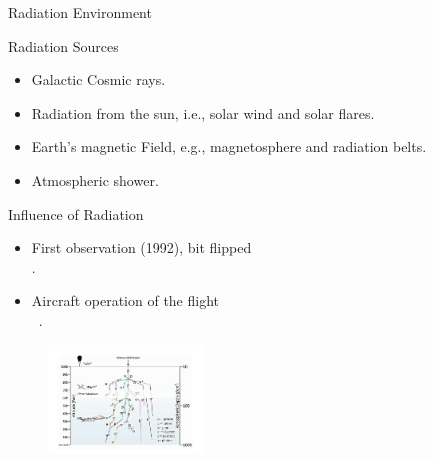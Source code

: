 \documentclass[aspectratio=1610]{beamer}
\begin{document}
\begin{frame}{Radiation Environment}



\begin{block}{Radiation Sources}

\end{block}
\begin{itemize}

\item Galactic Cosmic rays.
\item Radiation from the sun, i.e., solar wind and solar flares.
\item Earth's magnetic Field, e.g., magnetosphere and radiation belts.
\item Atmospheric shower.
\end{itemize}


\begin{block}{Influence of Radiation}
\end{block}
\begin{itemize}

\item First observation (1992), bit flipped~ \\\citep{taber1995investigation}.
\item Aircraft operation of the flight \\ ~\citep{SWE2016}.


\end{itemize}
\vspace{-3cm}

\begin{figure}[h]
   \includegraphics[width=0.37\textwidth, right]{Figures/showerplusaircraft.png}

\label{shower}
\end{figure}
\vspace{-0.7cm} 
\hspace{9.0 cm}



\end{frame}
\end{document}
